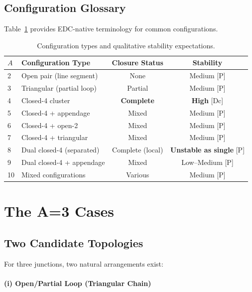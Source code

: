 \tagP

\subsection{Configuration Glossary}

Table~\ref{tab:config_glossary} provides EDC-native terminology for common
configurations.

\begin{table}[h]
\centering
\caption{Configuration types and qualitative stability expectations.}
\label{tab:config_glossary}
\begin{tabular}{llcc}
    \toprule
    $A$ & Configuration Type & Closure Status & Stability \\
    \midrule
    2 & Open pair (line segment) & None & Medium [P] \\
    3 & Triangular (partial loop) & Partial & Medium [P] \\
    4 & Closed-4 cluster & \textbf{Complete} & \textbf{High} [Dc] \\
    5 & Closed-4 + appendage & Mixed & Medium [P] \\
    6 & Closed-4 + open-2 & Mixed & Medium [P] \\
    7 & Closed-4 + triangular & Mixed & Medium [P] \\
    8 & Dual closed-4 (separated) & Complete (local) & \textbf{Unstable as single} [P] \\
    9 & Dual closed-4 + appendage & Mixed & Low--Medium [P] \\
    10 & Mixed configurations & Various & Medium [P] \\
    \bottomrule
\end{tabular}
\end{table}

\section{The A=3 Cases}
\label{sec:light:a3}

\subsection{Two Candidate Topologies}

For three junctions, two natural arrangements exist:

\paragraph{(i) Open/Partial Loop (Triangular Chain)}

